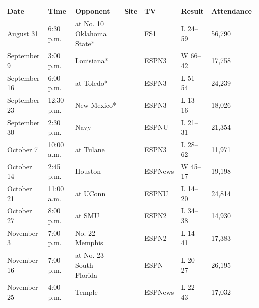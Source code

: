 \documentclass{article}
\begin{document}
\begin{tabular}{lllllll}
\toprule
Date & Time & Opponent & Site & TV & Result & Attendance \\
\midrule
August 31 & 6:30 p.m. & at No. 10 Oklahoma State* &  & FS1 & L 24–59 & 56,790 \\
September 9 & 3:00 p.m. & Louisiana* &  & ESPN3 & W 66–42 & 17,758 \\
September 16 & 6:00 p.m. & at Toledo* &  & ESPN3 & L 51–54 & 24,239 \\
September 23 & 12:30 p.m. & New Mexico* &  & ESPN3 & L 13–16 & 18,026 \\
September 30 & 2:30 p.m. & Navy &  & ESPNU & L 21–31 & 21,354 \\
October 7 & 10:00 a.m. & at Tulane &  & ESPN3 & L 28–62 & 11,971 \\
October 14 & 2:45 p.m. & Houston &  & ESPNews & W 45–17 & 19,198 \\
October 21 & 11:00 a.m. & at UConn &  & ESPNU & L 14–20 & 24,814 \\
October 27 & 8:00 p.m. & at SMU &  & ESPN2 & L 34–38 & 14,930 \\
November 3 & 7:00 p.m. & No. 22 Memphis &  & ESPN2 & L 14–41 & 17,383 \\
November 16 & 7:00 p.m. & at No. 23 South Florida &  & ESPN & L 20–27 & 26,195 \\
November 25 & 4:00 p.m. & Temple &  & ESPNews & L 22–43 & 17,032 \\
\bottomrule
\end{tabular}
\end{document}
